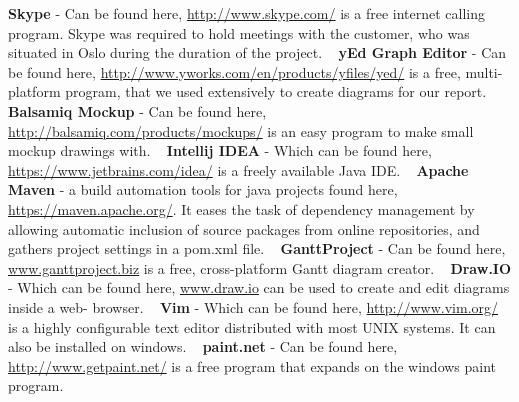 \documentclass[../document]{subfiles}
\begin{document}
\textbf{Skype} - Can be found here, \url{http://www.skype.com/} is a free internet calling program. Skype was required to hold meetings with the customer, who was situated in Oslo during the duration of the project.
\newline \ \newline
\textbf{yEd Graph Editor} - Can be found here, \url{http://www.yworks.com/en/products/yfiles/yed/} is a free, multi-platform program, that we used extensively to create diagrams for our report.
\newline \ \newline
\textbf{Balsamiq Mockup} - Can be found here, \url{http://balsamiq.com/products/mockups/} is an easy program to make small mockup drawings with. 
\newline \ \newline
\textbf{Intellij IDEA} - Which can be found here, \url{https://www.jetbrains.com/idea/} is a freely available Java IDE.
\newline \ \newline
\textbf{Apache Maven} - a build automation tools for java projects found here, \url{https://maven.apache.org/}. It eases the task of dependency management by allowing automatic inclusion of source packages from online repositories, and gathers project settings in a pom.xml file.
\newline \ \newline
\textbf{GanttProject} - Can be found here, \url{www.ganttproject.biz} is a free, cross-platform Gantt diagram creator.
\newline \ \newline
\textbf{Draw.IO} - Which can be found here, \url{www.draw.io} can be used to create and edit diagrams inside a web- browser.
\newline \ \newline
\textbf{Vim} - Which can be found here, \url{http://www.vim.org/} is a highly configurable text editor distributed with most UNIX systems. It can also be installed on windows.
\newline \ \newline
\textbf{paint.net} - Can be found here, \url{http://www.getpaint.net/} is a free program that expands on the windows paint program. 
\end{document}
